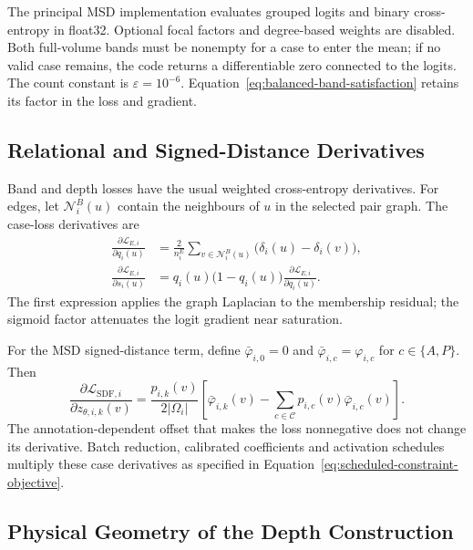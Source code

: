 \documentclass[12pt,a4paper]{article}
\begin{document}
The principal MSD implementation evaluates grouped logits and binary
cross-entropy in float32. Optional focal factors and degree-based
weights are disabled. Both full-volume bands must be nonempty for a
case to enter the mean; if no valid case remains, the code returns a
differentiable zero connected to the logits. The count constant is
$\varepsilon=10^{-6}$. Equation~\ref{eq:balanced-band-satisfaction} retains its
factor in the loss and gradient.


\subsection{Relational and Signed-Distance Derivatives}

Band and depth losses have the usual weighted cross-entropy derivatives.
For edges, let $\mathcal N_i^B(u)$ contain the neighbours of $u$ in
the selected pair graph. The case-loss derivatives are
\begin{equation}
\begin{aligned}
\frac{\partial\mathcal{L}_{E,i}}{\partial q_i(u)}
 &=\frac{2}{n_i^E}\sum_{v\in\mathcal{N}_i^B(u)}
       \bigl(\delta_i(u)-\delta_i(v)\bigr),\\
\frac{\partial\mathcal{L}_{E,i}}{\partial s_i(u)}
 &=q_i(u)\bigl(1-q_i(u)\bigr)
   \frac{\partial\mathcal{L}_{E,i}}{\partial q_i(u)}.
\end{aligned}
\label{eq:edge-logit-gradient}
\end{equation}
The first expression applies the graph Laplacian to the membership
residual; the sigmoid factor attenuates the logit gradient near saturation.

For the MSD signed-distance term, define $\bar\varphi_{i,0}=0$ and
$\bar\varphi_{i,c}=\varphi_{i,c}$ for $c\in\{A,P\}$. Then
\begin{equation}
\frac{\partial\mathcal{L}_{\mathrm{SDF},i}}
     {\partial z_{\theta,i,k}(v)}
=\frac{p_{i,k}(v)}{2|\Omega_i|}
 \left[\bar\varphi_{i,k}(v)
       -\sum_{c\in\mathcal{C}}p_{i,c}(v)\bar\varphi_{i,c}(v)\right].
\label{eq:sdf-logit-gradient}
\end{equation}
The annotation-dependent offset that makes the loss nonnegative does
not change its derivative. Batch reduction, calibrated coefficients and
activation schedules multiply these case derivatives as specified in
Equation~\ref{eq:scheduled-constraint-objective}.

\subsection{Physical Geometry of the Depth Construction}
\end{document}
